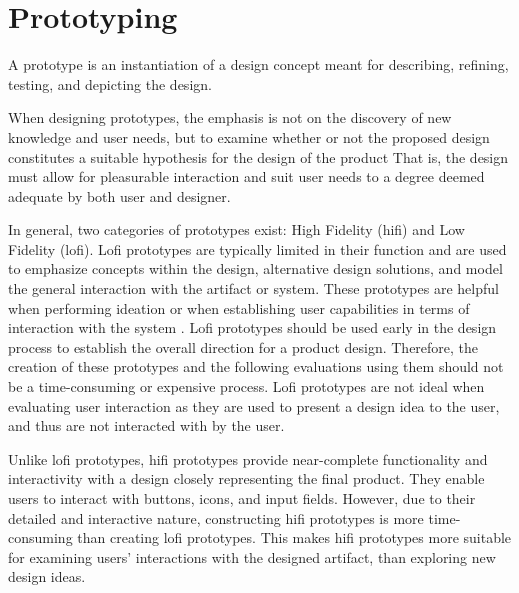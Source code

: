 \section{Prototyping} %
A prototype is an instantiation of a design concept meant for describing, refining, testing, and depicting the design.\cite{BUXTON2007139_prototyping}

When designing prototypes, the emphasis is not on the discovery of new knowledge and user needs, but to examine whether or not the proposed design constitutes a suitable hypothesis for the design of the product\cite{nielsen-norman-prototype-low-vs-high,BUXTON2007139_prototyping}
That is, the design must allow for pleasurable interaction and suit user needs to a degree deemed adequate by both user and designer.

In general, two categories of prototypes exist: High Fidelity (hifi) and Low Fidelity (lofi).
Lofi prototypes are typically limited in their function and are used to emphasize concepts within the design, alternative design solutions, and model the general interaction with the artifact or system\cite{low-vs-high-fidelity-prototype}.
These prototypes are helpful when performing ideation\cite{nielsen-norman-ideation} or when establishing user capabilities in terms of interaction with the system \cite{usefullness-of-different-prototypes,low-vs-high-fidelity-prototype}.
Lofi prototypes should be used early in the design process to establish the overall direction for a product design. 
Therefore, the creation of these prototypes and the following evaluations using them should not be a time-consuming or expensive process. \cite{usefullness-of-different-prototypes,low-vs-high-fidelity-prototype} 
Lofi prototypes are not ideal when evaluating user interaction as they are used to present a design idea to the user, and thus are not interacted with by the user\cite{low-vs-high-fidelity-prototype}.

Unlike lofi prototypes, hifi prototypes provide near-complete functionality and interactivity with a design closely representing the final product.
They enable users to interact with buttons, icons, and input fields.
However, due to their detailed and interactive nature, constructing hifi prototypes is more time-consuming than creating lofi prototypes. 
This makes hifi prototypes more suitable for examining users' interactions with the designed artifact, than exploring new design ideas. \cite{nielsen-norman-prototype-low-vs-high,low-vs-high-fidelity-prototype}



